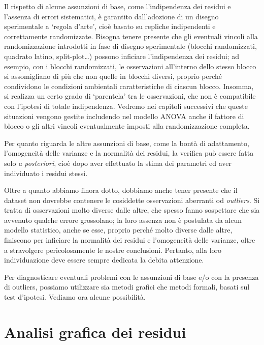 \documentclass[
  12pt,
]{book}
\begin{document}
Il rispetto di alcune assunzioni di base, come l'indipendenza dei residui e l'assenza di errori sistematici, è garantito dall'adozione di un disegno sperimentale a `regola d'arte', cioè basato su repliche indipendenti e correttamente randomizzate. Bisogna tenere presente che gli eventuali vincoli alla randomizzazione introdotti in fase di disegno sperimentale (blocchi randomizzati, quadrato latino, split-plot\ldots) possono inficiare l'indipendenza dei residui; ad esempio, con i blocchi randomizzati, le osservazioni all'interno dello stesso blocco si assomigliano di più che non quelle in blocchi diversi, proprio perché condividono le condizioni ambientali caratteristiche di ciascun blocco. Insomma, si realizza un certo grado di `parentela' tra le osservazioni, che non è compatibile con l'ipotesi di totale indipendenza. Vedremo nei capitoli successivi che queste situazioni vengono gestite includendo nel modello ANOVA anche il fattore di blocco o gli altri vincoli eventualmente imposti alla randomizzazione completa.

Per quanto riguarda le altre assunzioni di base, come la bontà di adattamento, l'omogeneità delle varianze e la normalità dei residui, la verifica può essere fatta solo \emph{a posteriori}, cioè dopo aver effettuato la stima dei parametri ed aver individuato i residui stessi.

Oltre a quanto abbiamo finora dotto, dobbiamo anche tener presente che il dataset non dovrebbe contenere le cosiddette osservazioni aberranti od \emph{outliers}. Si tratta di osservazioni molto diverse dalle altre, che spesso fanno sospettare che sia avvenuto qualche errore grossolano; la loro assenza non è postulata da alcun modello statistico, anche se esse, proprio perché molto diverse dalle altre, finiscono per inficiare la normalità dei residui e l'omogeneità delle varianze, oltre a stravolgere pericolosamente le nostre conclusioni. Pertanto, alla loro individuazione deve essere sempre dedicata la debita attenzione.

Per diagnosticare eventuali problemi con le assunzioni di base e/o con la presenza di outliers, possiamo utilizzare sia metodi grafici che metodi formali, basati sul test d'ipotesi. Vediamo ora alcune possibilità.

\hypertarget{analisi-grafica-dei-residui}{%
\section{Analisi grafica dei residui}\label{analisi-grafica-dei-residui}}
\end{document}
